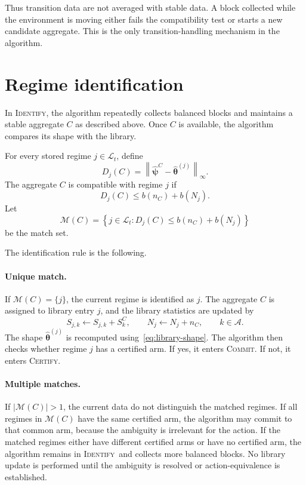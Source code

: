 \documentclass[11pt]{article}
\newcommand{\A}{\mathcal A}
\newcommand{\Lcal}{\mathcal L}
\newcommand{\norm}[1]{\left\lVert #1 \right\rVert}
\newcommand{\ID}{\textsc{Identify}}
\newcommand{\CERT}{\textsc{Certify}}
\newcommand{\COMMIT}{\textsc{Commit}}
\begin{document}
Thus transition data are not averaged with stable data. A block collected while the environment is moving either fails the compatibility test or starts a new candidate aggregate. This is the only transition-handling mechanism in the algorithm.

\section{Regime identification}

In \ID, the algorithm repeatedly collects balanced blocks and maintains a stable aggregate $C$ as described above. Once $C$ is available, the algorithm compares its shape with the library.

For every stored regime $j\in\Lcal_t$, define
\begin{equation}
    D_j(C)=\norm{\widehat{\bm\psi}^{C}-\widehat{\bm\theta}^{(j)}}_\infty.
    \label{eq:distance}
\end{equation}
The aggregate $C$ is compatible with regime $j$ if
\begin{equation}
    D_j(C)\leq b(n_C)+b(N_j).
    \label{eq:compatible-regime}
\end{equation}
Let
\begin{equation}
    \mathcal M(C)=\left\{j\in\Lcal_t:
    D_j(C)\leq b(n_C)+b(N_j)
    \right\}
    \label{eq:match-set}
\end{equation}
be the match set.

The identification rule is the following.

\paragraph{Unique match.}
If $\mathcal M(C)=\{j\}$, the current regime is identified as $j$. The aggregate $C$ is assigned to library entry $j$, and the library statistics are updated by
\begin{equation}
    S_{j,k}\leftarrow S_{j,k}+S^C_k,
    \qquad
    N_j\leftarrow N_j+n_C,
    \qquad k\in\A.
    \label{eq:library-update}
\end{equation}
The shape $\widehat{\bm\theta}^{(j)}$ is recomputed using~\eqref{eq:library-shape}. The algorithm then checks whether regime $j$ has a certified arm. If yes, it enters \COMMIT. If not, it enters \CERT.

\paragraph{Multiple matches.}
If $|\mathcal M(C)|>1$, the current data do not distinguish the matched regimes. If all regimes in $\mathcal M(C)$ have the same certified arm, the algorithm may commit to that common arm, because the ambiguity is irrelevant for the action. If the matched regimes either have different certified arms or have no certified arm, the algorithm remains in \ID\ and collects more balanced blocks. No library update is performed until the ambiguity is resolved or action-equivalence is established.
\end{document}
